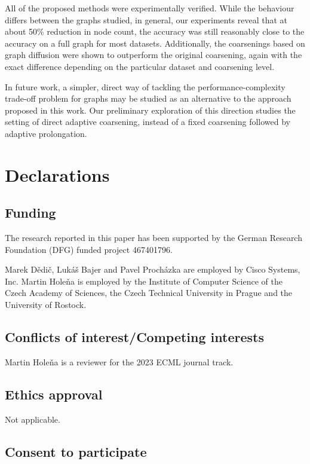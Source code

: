 \documentclass[sn-mathphys,pdflatex,iicol]{sn-jnl}%
\begin{document}
All of the proposed methods were experimentally verified. While the behaviour differs between the graphs studied, in general, our experiments reveal that at about 50\% reduction in node count, the accuracy was still reasonably close to the accuracy on a full graph for most datasets. Additionally, the coarsenings based on graph diffusion were shown to outperform the original coarsening, again with the exact difference depending on the particular dataset and coarsening level.

In future work, a simpler, direct way of tackling the performance-complexity trade-off problem for graphs may be studied as an alternative to the approach proposed in this work. Our preliminary exploration of this direction \cite{prochazka_downstream_2022} studies the setting of direct adaptive coarsening, instead of a fixed coarsening followed by adaptive prolongation.

\section*{Declarations}

\subsection*{Funding}

The research reported in this paper has been supported by the German Research Foundation (DFG) funded project 467401796.

Marek Dědič, Lukáš Bajer and Pavel Procházka are employed by Cisco Systems, Inc. Martin Holeňa is employed by the Institute of Computer Science of the Czech Academy of Sciences, the Czech Technical University in Prague and the University of Rostock.

\subsection*{Conflicts of interest/Competing interests}

Martin Holeňa is a reviewer for the 2023 ECML journal track.

\subsection*{Ethics approval}

Not applicable.

\subsection*{Consent to participate}
\end{document}
